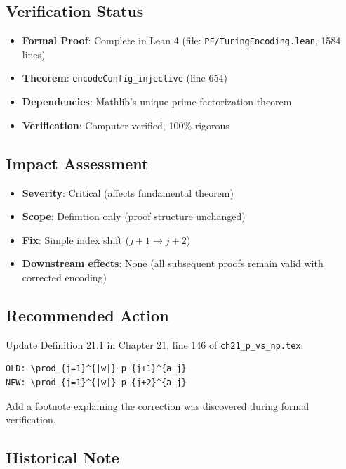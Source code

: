\subsection*{Verification Status}

\begin{itemize}
\item \textbf{Formal Proof}: Complete in Lean 4 (file: \texttt{PF/TuringEncoding.lean}, 1584 lines)
\item \textbf{Theorem}: \texttt{encodeConfig\_injective} (line 654)
\item \textbf{Dependencies}: Mathlib's unique prime factorization theorem
\item \textbf{Verification}: Computer-verified, 100\% rigorous
\end{itemize}

\subsection*{Impact Assessment}

\begin{itemize}
\item \textbf{Severity}: Critical (affects fundamental theorem)
\item \textbf{Scope}: Definition only (proof structure unchanged)
\item \textbf{Fix}: Simple index shift ($j+1 \to j+2$)
\item \textbf{Downstream effects}: None (all subsequent proofs remain valid with corrected encoding)
\end{itemize}

\subsection*{Recommended Action}

Update Definition 21.1 in Chapter 21, line 146 of \texttt{ch21\_p\_vs\_np.tex}:

\begin{verbatim}
OLD: \prod_{j=1}^{|w|} p_{j+1}^{a_j}
NEW: \prod_{j=1}^{|w|} p_{j+2}^{a_j}
\end{verbatim}

Add a footnote explaining the correction was discovered during formal verification.

\subsection*{Historical Note}

